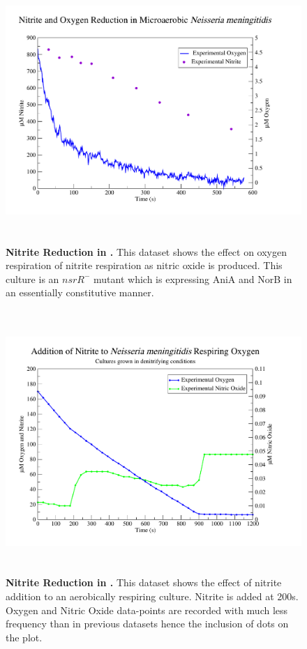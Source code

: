 \begin{figure}[tbp]
 \centering
 \includegraphics[height=10cm]{./07-nitritereduction/data/dataset1.pdf}
 \caption[Nitrite Reduction in \Nsm{}]{{\bf Nitrite Reduction in \Nsm{}.} This dataset shows the effect on oxygen respiration of nitrite respiration as nitric oxide is produced. This culture is an $nsrR^-$ mutant which is expressing AniA and NorB in an essentially constitutive manner.
 \label{fig:nitriteds1}}
\end{figure}

\begin{figure}[tbp]
 \centering
 \includegraphics[height=10cm]{./07-nitritereduction/data/dataset2.pdf}
 \caption[Nitrite Reduction in \Nsm{}]{{\bf Nitrite Reduction in \Nsm{}.} This dataset shows the effect of nitrite addition to an aerobically respiring culture. Nitrite is added at 200s. Oxygen and Nitric Oxide data-points are recorded with much less frequency than in previous datasets hence the inclusion of dots on the plot.
 \label{fig:nitriteds2}}
\end{figure}

